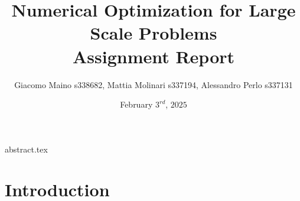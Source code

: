 \documentclass{article}
\title{Numerical Optimization for Large Scale Problems\\
\Large Assignment Report}
\author{Giacomo Maino s338682, Mattia Molinari s337194, Alessandro Perlo s337131}
\date{February $3^{rd}$, $2025$}
\begin{document}
\maketitle

{abstract.tex}

\tableofcontents


\section{Introduction}
\end{document}
